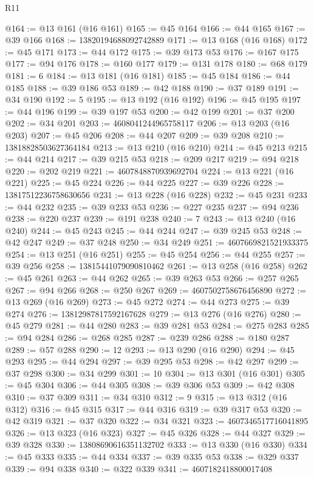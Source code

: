 \begin{lexlean}{R11}
\begin{coremodule}
@164 := @13 @161 (@16 @161)
@165 := @45 @164
@166 := @44 @165
@167 := @39 @166
@168 := 13820194688092742889
@171 := @13 @168 (@16 @168)
@172 := @45 @171
@173 := @44 @172
@175 := @39 @173 @53
@176 := @167 @175
@177 := @94 @176
@178 := @160 @177
@179 := @131 @178
@180 := @68 @179
@181 := 6
@184 := @13 @181 (@16 @181)
@185 := @45 @184
@186 := @44 @185
@188 := @39 @186 @53
@189 := @42 @188
@190 := @37 @189
@191 := @34 @190
@192 := 5
@195 := @13 @192 (@16 @192)
@196 := @45 @195
@197 := @44 @196
@199 := @39 @197 @53
@200 := @42 @199
@201 := @37 @200
@202 := @34 @201
@203 := 4608041244965758117
@206 := @13 @203 (@16 @203)
@207 := @45 @206
@208 := @44 @207
@209 := @39 @208
@210 := 13818828503627364184
@213 := @13 @210 (@16 @210)
@214 := @45 @213
@215 := @44 @214
@217 := @39 @215 @53
@218 := @209 @217
@219 := @94 @218
@220 := @202 @219
@221 := 4607848870939692704
@224 := @13 @221 (@16 @221)
@225 := @45 @224
@226 := @44 @225
@227 := @39 @226
@228 := 13817512236758630656
@231 := @13 @228 (@16 @228)
@232 := @45 @231
@233 := @44 @232
@235 := @39 @233 @53
@236 := @227 @235
@237 := @94 @236
@238 := @220 @237
@239 := @191 @238
@240 := 7
@243 := @13 @240 (@16 @240)
@244 := @45 @243
@245 := @44 @244
@247 := @39 @245 @53
@248 := @42 @247
@249 := @37 @248
@250 := @34 @249
@251 := 4607669821521933375
@254 := @13 @251 (@16 @251)
@255 := @45 @254
@256 := @44 @255
@257 := @39 @256
@258 := 13815441079090810462
@261 := @13 @258 (@16 @258)
@262 := @45 @261
@263 := @44 @262
@265 := @39 @263 @53
@266 := @257 @265
@267 := @94 @266
@268 := @250 @267
@269 := 4607502758676456890
@272 := @13 @269 (@16 @269)
@273 := @45 @272
@274 := @44 @273
@275 := @39 @274
@276 := 13812987817592167628
@279 := @13 @276 (@16 @276)
@280 := @45 @279
@281 := @44 @280
@283 := @39 @281 @53
@284 := @275 @283
@285 := @94 @284
@286 := @268 @285
@287 := @239 @286
@288 := @180 @287
@289 := @57 @288
@290 := 12
@293 := @13 @290 (@16 @290)
@294 := @45 @293
@295 := @44 @294
@297 := @39 @295 @53
@298 := @42 @297
@299 := @37 @298
@300 := @34 @299
@301 := 10
@304 := @13 @301 (@16 @301)
@305 := @45 @304
@306 := @44 @305
@308 := @39 @306 @53
@309 := @42 @308
@310 := @37 @309
@311 := @34 @310
@312 := 9
@315 := @13 @312 (@16 @312)
@316 := @45 @315
@317 := @44 @316
@319 := @39 @317 @53
@320 := @42 @319
@321 := @37 @320
@322 := @34 @321
@323 := 4607346517716041895
@326 := @13 @323 (@16 @323)
@327 := @45 @326
@328 := @44 @327
@329 := @39 @328
@330 := 13808690616351132702
@333 := @13 @330 (@16 @330)
@334 := @45 @333
@335 := @44 @334
@337 := @39 @335 @53
@338 := @329 @337
@339 := @94 @338
@340 := @322 @339
@341 := 4607182418800017408

\end{coremodule}
\end{lexlean}
